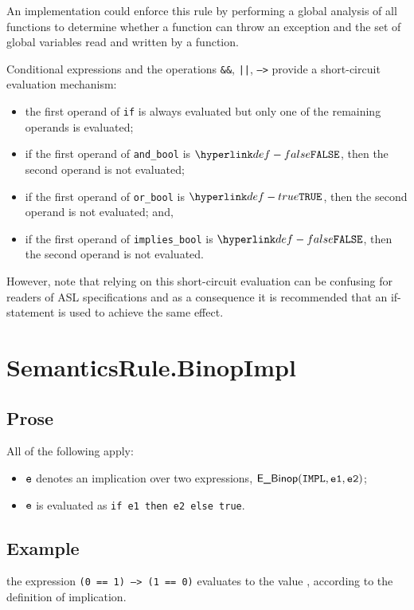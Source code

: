 \documentclass{book}
\newcommand\veone[0]{\texttt{e1}}
\newcommand\vetwo[0]{\texttt{e2}}
\begin{document}

An implementation could enforce this rule by performing a global analysis of
all functions to determine whether a function can throw an exception and the
set of global variables read and written by a function.

Conditional expressions and the operations \texttt{\&\&}, \texttt{||},
\texttt{-->} provide a short-circuit evaluation mechanism:

\begin{itemize}
\item the first operand of \texttt{if} is always evaluated but only one of the
remaining operands is evaluated;
\item if the first operand of \texttt{and\_bool} is $\False$, then the second operand is not evaluated;
\item if the first operand of \texttt{or\_bool} is $\True$, then the second operand is not evaluated; and,
\item if the first operand of \texttt{implies\_bool} is $\False$, then the
second operand is not evaluated.
\end{itemize}

However, note that relying on this short-circuit evaluation can be confusing
for readers of ASL specifications and as a consequence it is recommended that
an if-statement is used to achieve the same effect.

\section{SemanticsRule.BinopImpl \label{sec:SemanticsRule.BinopImpl}}
\subsection{Prose}
All of the following apply:
\begin{itemize}
  \item $\texttt{e}$ denotes an implication over two expressions, $\EBinop(\IMPL, \veone, \vetwo)$;
  \item $\texttt{e}$ is evaluated as \texttt{if e1 then e2 else true}.
\end{itemize}

\subsection{Example}
the expression \texttt{(0 == 1) --> (1 == 0)} evaluates to the value \True, according to the definition of implication.
\end{document}

